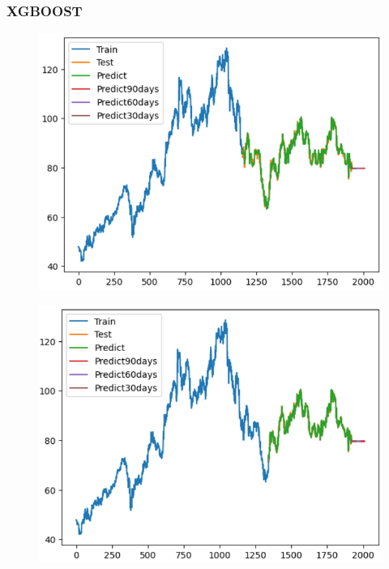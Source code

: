 \documentclass[conference]{IEEEtran}
\begin{document}
\subsubsection{XGBOOST}


\begin{figure}[H]
    \centering
    \begin{minipage}{0.15\textwidth}
    \centering
    \includegraphics[width=1\textwidth]{Image/XGBoost/XGBoost_SONY_6_4.png}
   
    \label{fig:1}
    \end{minipage}%
    \begin{minipage}{0.15\textwidth}
    \centering
    \includegraphics[width=1\textwidth]{Image/XGBoost/XGBoost_SONY_7_3.png}
  

\end{minipage}
\end{figure}
\end{document}
